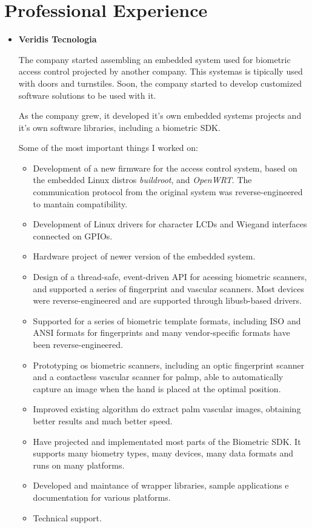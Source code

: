 \documentclass[a4paper,10pt]{article}
\begin{document}
  \section{Professional Experience}
    \begin{itemize}
      \item  
        \textbf{Veridis Tecnologia}

        The company started assembling an embedded system used for biometric access control projected by another company. This systemas is tipically used with doors and turnstiles. Soon, the company started to develop customized software solutions to be used with it.

        As the company grew, it developed it's own embedded systems projects and it's own software libraries, including a biometric SDK.

        Some of the most important things I worked on:
        \begin{itemize}
          \item Development of a new firmware for the access control system, based on the embedded Linux distros \emph{buildroot}, and \emph{OpenWRT}. The communication protocol from the original system was reverse-engineered to mantain compatibility.
	  \item Development of Linux drivers for character LCDs and Wiegand interfaces connected on GPIOs.
	  \item Hardware project of newer version of the embedded system.
          \item Design of a thread-safe, event-driven API for acessing biometric scanners, and supported a series of fingerprint and vascular scanners. Most devices were reverse-engineered and are supported through libusb-based drivers.
          \item Supported for a series of biometric template formats, including ISO and ANSI formats for fingerprints and many vendor-specific formats have been reverse-engineered.
          \item Prototyping os biometric scanners, including an optic fingerprint scanner and a contactless vascular scanner for palmp, able to automatically capture an image when the hand is placed at the optimal position.
          \item Improved existing algorithm do extract palm vascular images, obtaining better results and much better speed.
          \item Have projected and implementated most parts of the Biometric SDK. It supports many biometry types, many devices, many data formats and runs on many platforms.
          \item Developed and maintance of wrapper libraries, sample applications e documentation for various platforms.
          \item Technical support.
        \end{itemize}


\end{itemize}
\end{document}
